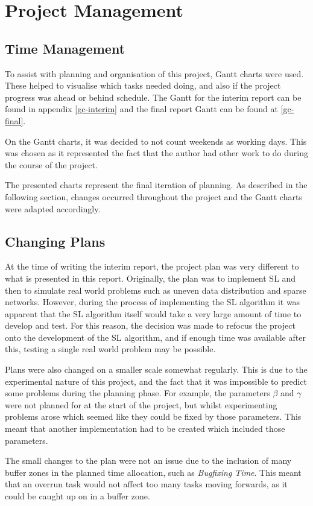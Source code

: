 \chapter{Project Management}
\section{Time Management}
To assist with planning and organisation of this project, Gantt charts were used. These helped to visualise which tasks needed doing, and also if the project progress was ahead or behind schedule. The Gantt for the interim report can be found in appendix \ref{gc-interim} and the final report Gantt can be found at \ref{gc-final}.

On the Gantt charts, it was decided to not count weekends as working days. This was chosen as it represented the fact that the author had other work to do during the course of the project.

The presented charts represent the final iteration of planning. As described in the following section, changes occurred throughout the project and the Gantt charts were adapted accordingly.

\section{Changing Plans}
At the time of writing the interim report, the project plan was very different to what is presented in this report. Originally, the plan was to implement SL and then to simulate real world problems such as uneven data distribution and sparse networks. However, during the process of implementing the SL algorithm it was apparent that the SL algorithm itself would take a very large amount of time to develop and test. For this reason, the decision was made to refocus the project onto the development of the SL algorithm, and if enough time was available after this, testing a single real world problem may be possible.

Plans were also changed on a smaller scale somewhat regularly. This is due to the experimental nature of this project, and the fact that it was impossible to predict some problems during the planning phase. For example, the parameters $\beta$ and $\gamma$ were not planned for at the start of the project, but whilst experimenting problems arose which seemed like they could be fixed by those parameters. This meant that another implementation had to be created which included those parameters.

The small changes to the plan were not an issue due to the inclusion of many buffer zones in the planned time allocation, such as \emph{Bugfixing Time}. This meant that an overrun task would not affect too many tasks moving forwards, as it could be caught up on in a buffer zone.

